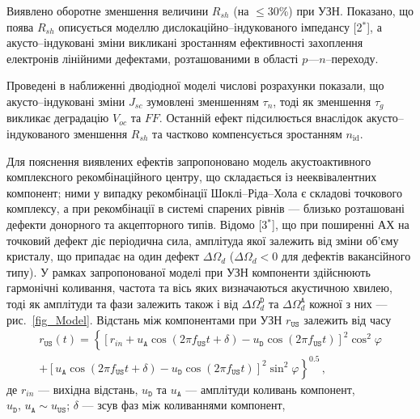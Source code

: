 Виявлено оборотне зменшення величини  
$R_{sh}$
(на $\leq$30\%) при УЗН.
Показано, що поява $R_{sh}$ описується моделлю дислокаційно--індукованого імпедансу
[2$^*$], а акусто--індуковані зміни викликані зростанням ефективності захоплення електронів лінійними дефектами, розташованими в області $p$---$n$--переходу.

Проведені в наближенні дводіодної моделі числові розрахунки показали, що акусто--індуковані зміни $J_{sc}$ зумовлені зменшенням $\tau_{n}$,
тоді як зменшення $\tau_{g}$ викликає деградацію $V_{oc}$ та $F\!F$.
Останній ефект підсилюється внаслідок акусто--індукованого зменшення $R_{sh}$ та частково компенсується зростанням $n_\mathrm{id}$.

Для пояснення виявлених ефектів запропоновано модель акустоактивного комплексного рекомбінаційного центру, що складається із нееквівалентних компонент;
ними у випадку рекомбінації Шоклі--Ріда--Хола є складові точкового комплексу, а 
при рекомбінації в системі спарених рівнів --- близько розташовані дефекти донорного та акцепторного типів.
Відомо
[3$^*$], що
при поширенні АХ на точковий дефект діє періодична сила, амплітуда якої залежить від зміни об'єму кристалу, що припадає на один дефект $\Delta\Omega_d$
($\Delta\Omega_d<0$ для дефектів вакансійного типу).
У рамках запропонованої моделі при УЗН компоненти 
здійснюють гармонічні коливання, частота та вісь яких
визначаються акустичною хвилею, тоді як амплітуди та фази залежить також і від  $\Delta\Omega_d^\mathtt{D}$ та
$\Delta\Omega_d^\mathtt{A}$ кожної з них --- рис.~\ref{fig_Model}.
Відстань між компонентами при УЗН $r_\mathtt{US}$ залежить від часу
\begin{multline}
\label{eqrUS}
r_\mathtt{US}(t)=\left\{[r_{in}+u_\mathtt{A}\cos(2\pi f_\mathtt{US}t+\delta)-u_\mathtt{D}\cos(2\pi f_\mathtt{US}t)]^2\cos^2\varphi \right.\\
    \left.+ [u_\mathtt{A}\cos(2\pi f_\mathtt{US}t+\delta)-u_\mathtt{D}\cos(2\pi f_\mathtt{US}t)]^2\sin^2\varphi\right\}^{0.5}\,,
\end{multline}
де
$r_{in}$ --- вихідна відстань,
$u_\mathtt{D}$ та $u_\mathtt{A}$ --- амплітуди коливань компонент, $u_\mathtt{D},\,u_\mathtt{A}\sim u_\mathtt{US}$;
$\delta$ --- зсув фаз між коливаннями компонент,
